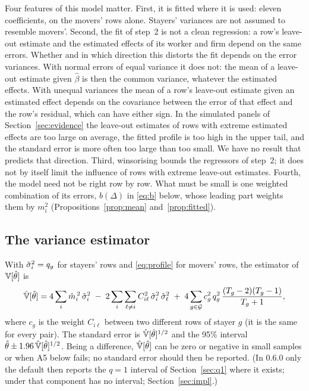Four features of this model matter. First, it is fitted where it is used: eleven coefficients, on the movers'
rows alone. Stayers' variances are not assumed to resemble movers'. Second, the fit of step~2 is not a clean
regression: a row's leave-out estimate and the estimated effects of its worker and firm depend on the same
errors. Whether and in which direction this distorts the fit depends on the error variances. With normal
errors of equal variance it does not: the mean of a leave-out estimate given $\hat\beta$ is then the common
variance, whatever the estimated effects. With unequal variances the mean of a
row's leave-out estimate given an estimated effect depends on the covariance between the error of that effect
and the row's residual, which can have either sign. In the simulated panels of Section~\ref{sec:evidence} the
leave-out estimates of rows with extreme estimated effects are too large on average, the fitted profile is
too high in the upper tail, and the standard error is more often too large than too small. We have no result that
predicts that direction. Third, winsorising bounds the regressors of step~2; it does not by itself limit the
influence of rows with extreme leave-out estimates. Fourth, the model need not be right row by row. What must be small is one
weighted combination of its errors, $b(\Delta)$ in \eqref{eq:b} below, whose leading part weights them by $m_i^2$
(Propositions~\ref{prop:mean} and~\ref{prop:fitted}).

\subsection{The variance estimator}

With $\tilde\sigma_i^2=q_g$ for stayers' rows and \eqref{eq:profile} for movers' rows, the estimator of
$\mathbb{V}[\hat\theta]$ is
\begin{equation}\label{eq:Vhat}
\hat{\mathbb{V}}[\hat\theta]=4\sum_i\hat m_i^{\,2}\,\tilde\sigma_i^2\;-\;2\sum_i\sum_{\ell\ne i}C_{i\ell}^2\,\tilde\sigma_i^2\,\tilde\sigma_\ell^2
\;+\;4\sum_{g\in\mathcal{G}}c_g^2\,q_g^2\,\frac{(T_g-2)(T_g-1)}{T_g+1},
\end{equation}
where $c_g$ is the weight $C_{i\ell}$ between two different rows of stayer $g$ (it is the same for every pair).
The standard error is $\hat{\mathbb{V}}[\hat\theta]^{1/2}$ and the 95\% interval
$\hat\theta\pm1.96\,\hat{\mathbb{V}}[\hat\theta]^{1/2}$. Being a difference, $\hat{\mathbb{V}}[\hat\theta]$ can be zero or negative in
small samples or when A5 below fails; no standard error should then be reported. (In \fevc{} 0.6.0 only the
default  then reports the $q=1$ interval of Section~\ref{sec:q1} where it exists; under
 that component has no interval; Section~\ref{sec:impl}.)


